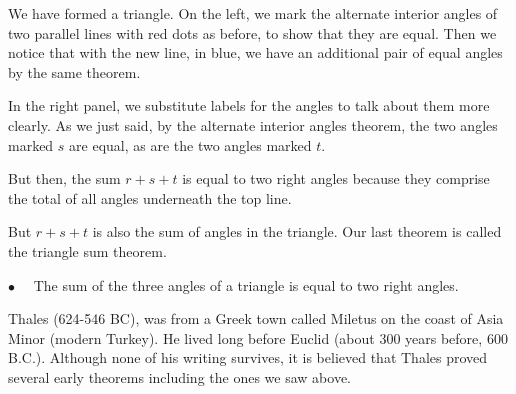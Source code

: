 \documentclass[11pt, oneside]{article}
\begin{document}
We have formed a triangle.  On the left, we mark the alternate interior angles of two parallel lines with red dots as before, to show that they are equal.  Then we notice that with the new line, in blue, we have an additional pair of equal angles by the same theorem.

In the right panel, we substitute labels for the angles to talk about them more clearly.  As we just said, by the alternate interior angles theorem, the two angles marked $s$ are equal, as are the two angles marked $t$.

But then, the sum $r + s + t$ is equal to two right angles because they comprise the total of all angles underneath the top line.

But $r + s + t$ is also the sum of angles in the triangle.  Our last theorem is called the triangle sum theorem.

$\bullet$ \ \ The sum of the three angles of a triangle is equal to two right angles.

Thales (624-546 BC), was from a Greek town called Miletus on the coast of Asia Minor (modern Turkey).  He lived long before Euclid (about 300 years before, 600 B.C.).  Although none of his writing survives, it is believed that Thales proved several early theorems including the ones we saw above.
\end{document}
